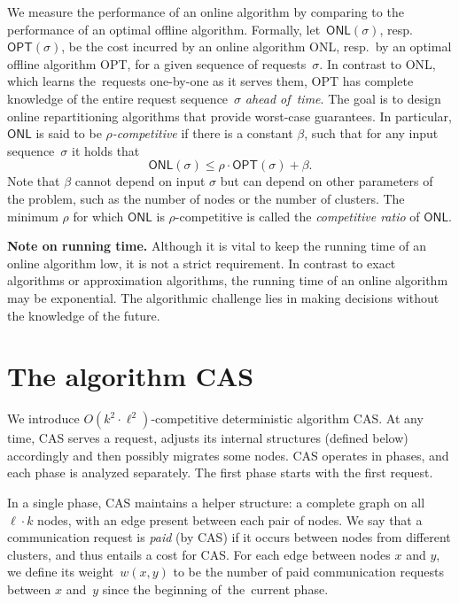 \documentclass[a4paper,USenglish]{lipics-v2019}
\newcommand{\OPT}{\textsf{OPT}\xspace}
\newcommand{\ONL}{\textsf{ONL}\xspace}
\newcommand{\DET}{\textsf{CAS}\xspace}
\begin{document}
We measure
the performance of an online algorithm by comparing to the performance of an optimal offline
algorithm. Formally, let~$\ONL(\sigma)$, resp.~$\OPT(\sigma)$, be the cost
incurred by an online algorithm \ONL, resp.~by an optimal offline
algorithm \OPT, for a given sequence of requests~$\sigma$. In contrast to \ONL, which learns the~requests one-by-one as
it serves them, \OPT has complete knowledge of the entire request
sequence~$\sigma$ \emph{ahead of~time}. The goal is to design online repartitioning
algorithms that provide worst-case guarantees. In particular, $\ONL$ is said
to be \emph{$\rho$-competitive} if there is a constant $\beta$, such that for any
input sequence~$\sigma$ it holds that
\[
	\ONL(\sigma) \leq \rho \cdot \OPT(\sigma) + \beta.
\]
Note that $\beta$ cannot depend on input $\sigma$ but can depend on other
parameters of the problem, such as the number of nodes or the number of clusters.
The minimum $\rho$ for which $\ONL$ is $\rho$-competitive is called the 
\emph{competitive ratio} of $\ONL$. 

\noindent
\textbf{Note on running time.}
Although it is vital to keep the running time of an online algorithm low, it is
not a strict requirement. In contrast to exact algorithms or approximation
algorithms, the running time of an online algorithm may be exponential.
The algorithmic challenge lies in making decisions without the knowledge of the
future.


\section{The algorithm CAS}
\label{sec:upper}

We introduce $O(k^2
\cdot \ell^2)$-competitive deterministic algorithm \DET. At any time, \DET
serves a request, adjusts its internal structures (defined below)
accordingly and then possibly migrates some nodes. \DET operates in phases, and each
phase is analyzed separately. The first phase starts with the first request.

In a single phase, \DET maintains a helper structure: a complete graph on all
$\ell \cdot k$ nodes, with an edge present between each pair of nodes. We say
that a communication request is \emph{paid} (by \DET) if it occurs between
nodes from different clusters, and thus entails a cost for \DET. For each edge
between nodes $x$ and $y$, we define its weight~$w(x,y)$ to be the number of
paid communication requests between $x$ and~$y$ since the beginning of~the~current phase.
\end{document}
